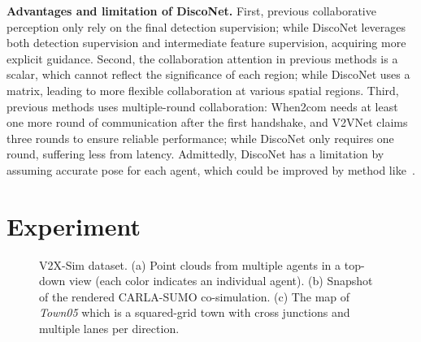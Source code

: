 \documentclass{article}
\begin{document}
\textbf{Advantages and limitation of DiscoNet.} 
First, previous collaborative perception only rely on the final detection supervision; while DiscoNet leverages both detection supervision and intermediate feature supervision, acquiring more explicit guidance.  Second, the collaboration attention in previous methods is a scalar, which cannot 
reflect the significance of each region; while DiscoNet uses a matrix, leading to more flexible collaboration at various spatial regions. Third, previous methods uses multiple-round collaboration: When2com needs at least one more round of communication after the first handshake, and V2VNet claims three rounds to ensure reliable performance; while DiscoNet only requires one round, suffering less from latency. Admittedly, DiscoNet has a limitation by assuming accurate pose for each agent, which could be improved by method like~\cite{Vadivelu2020LearningTC}.

\vspace{-2mm}
\section{Experiment}\label{sec:exp}
\vspace{-1mm}
\begin{figure}[t]
\centering
   \vspace{-2mm}
\centering
	\vspace{-2mm}
\caption{V2X-Sim  dataset. (a) Point clouds from multiple agents in a top-down view (each color indicates an individual agent). (b) Snapshot of the rendered CARLA-SUMO co-simulation. (c) The map of \textit{Town05} which is a squared-grid town with cross junctions and multiple lanes per direction.}
\label{fig:dataset}
	\vspace{-2mm}
\end{figure}
\end{document}
